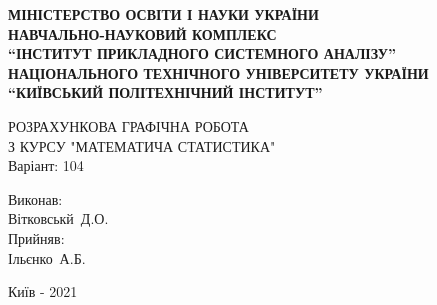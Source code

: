\documentclass[14pt,a4paper]{scrartcl}
\begin{document}
  \begin{titlepage}
    \begin{center}
      \textbf{МІНІСТЕРСТВО ОСВІТИ І НАУКИ УКРАЇНИ\\
      НАВЧАЛЬНО-НАУКОВИЙ КОМПЛЕКС\\
      ``ІНСТИТУТ ПРИКЛАДНОГО СИСТЕМНОГО АНАЛІЗУ''\\
      НАЦІОНАЛЬНОГО ТЕХНІЧНОГО УНІВЕРСИТЕТУ УКРАЇНИ\\
      ``КИЇВСЬКИЙ ПОЛІТЕХНІЧНИЙ ІНСТИТУТ''}


      \vspace{1.5cm}
      РОЗРАХУНКОВА ГРАФІЧНА РОБОТА\\
      З КУРСУ "МАТЕМАТИЧА СТАТИСТИКА"\\
      Варіант: 104

      \vspace{5cm}

      \begin{flushright}
        Виконав:\\
        Вітковськй~Д.О.\\
        \vspace{3mm}
        Прийняв:\\
        Ільєнко~А.Б.
      \end{flushright}

      \vfill

      Київ - 2021
    \end{center}
  \end{titlepage}

\def\be{\begin{equation}} %
\def\ee{\end{equation}}
\def\D{\mathbb{D}}
\def\E{\mathbb{E}}
\def\P{\mathbb{P}}
\def\N{\mathcal{N}}

\renewcommand{\contentsname}{Зміст}
\tableofcontents
\end{document}

